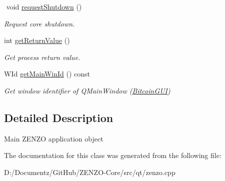 \begin{DoxyCompactItemize}
$$\mbox{\label{class_bitcoin_application_a37c560d4c04d14a6da151b82caf8888f}} 
void \mbox{\hyperlink{class_bitcoin_application_a37c560d4c04d14a6da151b82caf8888f}{request\+Shutdown}} ()
\begin{DoxyCompactList}\small\item\em Request core shutdown. \end{DoxyCompactList}\item 
\mbox{\label{class_bitcoin_application_a9d3e9f2aa0663d41976b20d33702992c}} 
int \mbox{\hyperlink{class_bitcoin_application_a9d3e9f2aa0663d41976b20d33702992c}{get\+Return\+Value}} ()
\begin{DoxyCompactList}\small\item\em Get process return value. \end{DoxyCompactList}\item 
\mbox{\label{class_bitcoin_application_aea7267368b0e232e2fe8485f29ca4180}} 
W\+Id \mbox{\hyperlink{class_bitcoin_application_aea7267368b0e232e2fe8485f29ca4180}{get\+Main\+Win\+Id}} () const
\begin{DoxyCompactList}\small\item\em Get window identifier of Q\+Main\+Window (\mbox{\hyperlink{class_bitcoin_g_u_i}{Bitcoin\+G\+UI}}) \end{DoxyCompactList}\end{DoxyCompactItemize}


\subsection{Detailed Description}
Main Z\+E\+N\+ZO application object 

The documentation for this class was generated from the following file\+:\begin{DoxyCompactItemize}
\item 
D\+:/\+Documentz/\+Git\+Hub/\+Z\+E\+N\+Z\+O-\/\+Core/src/qt/zenzo.\+cpp\end{DoxyCompactItemize}
